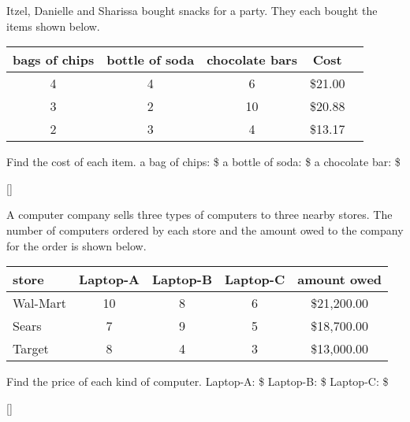 \documentclass[12pt,letterpaper]{memoir}
\begin{document}
%
%
\myWideProblemWithContent
{
    Itzel, Danielle and Sharissa bought snacks for a party. 
    They each bought the items shown below.
    \begin{center}
        \small
        \begin{tabular}{ccccc}
            bags of chips & bottle of soda & chocolate bars & Cost \\
            \toprule
            4 & 4 & 6  & \$21.00  \\
            3 & 2 & 10 & \$20.88  \\
            2 & 3 &  4 & \$13.17  \\
        \end{tabular}
    \end{center}
    Find the cost of each item.
    \mySystemTable[7]
    \small
    a bag of chips: \$
    \hfill 
    a bottle of soda: \$
    \hfill 
    a chocolate bar: \$
    }[\small]


%
%
\myWideProblemWithContent
{
    A computer company sells three types of computers 
    to three nearby stores. 
    The number of computers ordered by each store and the amount owed to the
    company for the order is shown below.
    \begin{center}
        \small
        \begin{tabular}{lcccc}
            store & Laptop-A & Laptop-B & Laptop-C & amount owed \\
            \toprule
            Wal-Mart & 10 & 8 & 6 & \$21,200.00  \\
            Sears    & 7  & 9 & 5 & \$18,700.00  \\
            Target   & 8  & 4 & 3 & \$13,000.00  \\
        \end{tabular}
    \end{center}
    Find the price of each kind of computer.
    \mySystemTable[7]
    \small
    Laptop-A: \$
    \hfil 
    Laptop-B: \$
    \hfil 
    Laptop-C: \$
    }[\small]
\end{document}

